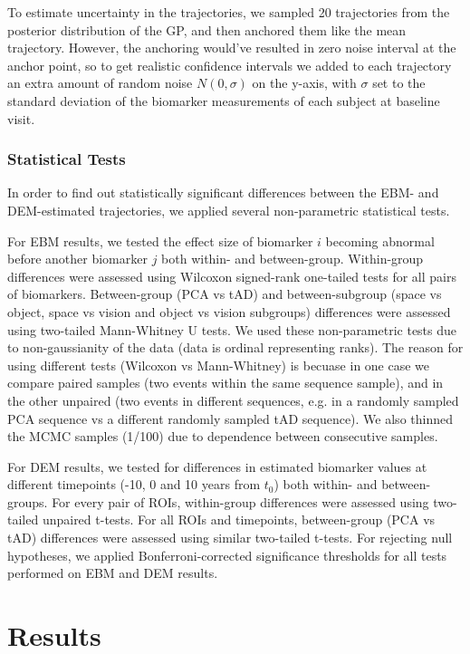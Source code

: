 To estimate uncertainty in the trajectories, we sampled 20 trajectories from the posterior distribution of the GP, and then anchored them like the mean trajectory. However, the anchoring would've resulted in zero noise interval at the anchor point, so to get realistic confidence intervals we added to each trajectory an extra amount of random noise $N(0, \sigma)$ on the y-axis, with $\sigma$ set to the standard deviation of the biomarker measurements of each subject at baseline visit.

\subsubsection{Statistical Tests}

In order to find out statistically significant differences between the EBM- and DEM-estimated trajectories, we applied several non-parametric statistical tests. 

For EBM results, we tested the effect size of  biomarker $i$ becoming abnormal before another biomarker $j$ both within- and between-group. Within-group differences were assessed using Wilcoxon signed-rank one-tailed tests for all pairs of biomarkers. Between-group (PCA vs tAD) and between-subgroup (space vs object, space vs vision and object vs vision subgroups) differences were assessed using two-tailed Mann-Whitney U tests. We used these non-parametric tests due to non-gaussianity of the data (data is ordinal representing ranks). The reason for using different tests (Wilcoxon vs Mann-Whitney) is becuase in one case we compare paired samples (two events within the same sequence sample), and in the other unpaired (two events in different sequences, e.g. in a randomly sampled PCA sequence vs a different randomly sampled tAD sequence). We also thinned the MCMC samples (1/100) due to dependence between consecutive samples. 

For DEM results, we tested for differences in estimated biomarker values at different timepoints (-10, 0 and 10 years from $t_0$) both within- and between-groups. For every pair of ROIs, within-group differences were assessed using two-tailed unpaired t-tests. For all ROIs and timepoints, between-group (PCA vs tAD) differences were assessed using similar two-tailed t-tests. For rejecting null hypotheses, we applied Bonferroni-corrected significance thresholds for all tests performed on EBM and DEM results.

\section{Results}
 
